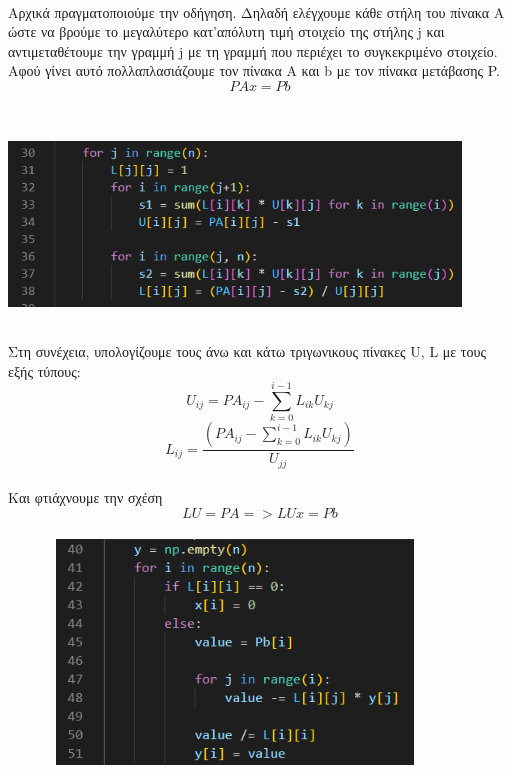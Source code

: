 \documentclass[a4paper,11pt]{article}
\newcommand{\lt}{\latintext}
\newcommand{\gt}{\greektext}
\begin{document}
\\
\normalsize{Αρχικά πραγματοποιούμε την οδήγηση. Δηλαδή ελέγχουμε κάθε
στήλη του πίνακα Α ώστε να βρούμε το μεγαλύτερο κατ'απόλυτη τιμή
στοιχείο της στήλης \lt j \gt και αντιμεταθέτουμε την γραμμή 
\lt j \gt με τη γραμμή που περιέχει το συγκεκριμένο στοιχείο. 
Αφού γίνει αυτό πολλαπλασιάζουμε τον πίνακα \lt A \gt και \lt b
\gt με τον πίνακα μετάβασης \lt P.}
\\
\begin{equation*}
	PAx = Pb
\end{equation*}
\\
\includegraphics[height=6cm, width=12cm]{LU.png}
\\
\normalsize{Στη συνέχεια, υπολογίζουμε τους άνω και κάτω τριγωνικους
πίνακες \lt U, L \gt με τους εξής τύπους:}	
\\
\begin{equation*}
U_{ij} = PA_{ij}-\sum_{k=0}^{i-1}L_{ik}U_{kj}
\end{equation*}
\begin{equation*}
L_{ij} = \frac{(PA_{ij}-\sum_{k=0}^{i-1}L_{ik}U_{kj})}{U_{jj}}
\end{equation*}
\\
\normalsize{Και φτιάχνουμε την σχέση}
\\
\begin{equation*}
	LU = PA => LUx = Pb
\end{equation*}
\\
\includegraphics[height=6cm, width=12cm]{y.png}
\end{document}
